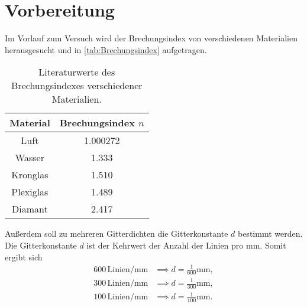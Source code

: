 \section{Vorbereitung}
\label{sec:Vorbereitung}

Im Vorlauf zum Versuch wird der Brechungsindex von verschiedenen Materialien herausgesucht und in \autoref{tab:Brechungsindex} aufgetragen.

\begin{table}
    \centering
    \caption{Literaturwerte des Brechungsindexes verschiedener Materialien.\cite{Brechungsindex} \cite{Brechungsindexplexi}  }
    \label{tab:Brechungsindex}
    \begin{tabular}{c S}
    \toprule
    {Material} &{Brechungsindex $n$}\\
    \midrule
        Luft & 1.000272 \\
        Wasser & 1.333 \\
        Kronglas & 1.510 \\
        Plexiglas & 1.489 \\
        Diamant & 2.417 \\
    \bottomrule
   
    \end{tabular}
\end{table}

Außerdem soll zu mehreren Gitterdichten die Gitterkonstante $d$ bestimmt werden.
Die Gitterkonstante $d$ ist der Kehrwert der Anzahl der Linien pro $\si{\milli\meter}$.
Somit ergibt sich
\begin{align*}
    600 \, \text{Linien} /\si{\milli\meter} & \implies  d = \frac{1}{600} \si{\milli\meter},\\
    300 \, \text{Linien} /\si{\milli\meter} & \implies  d = \frac{1}{300} \si{\milli\meter},\\
    100 \, \text{Linien} /\si{\milli\meter} & \implies  d = \frac{1}{100} \si{\milli\meter}.\\
\end{align*}